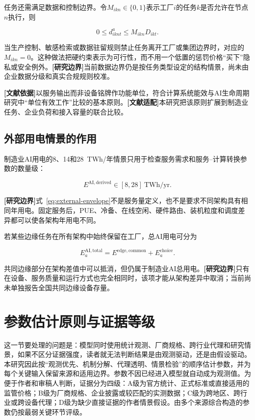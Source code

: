 \documentclass[preprint]{elsarticle}
\newcommand{\literature}{\textcolor{blue!70!black}{\textbf{[文献依据]}}}
\newcommand{\adapted}{\textcolor{violet!75!black}{\textbf{[文献适配]}}}
\newcommand{\boundary}{\textcolor{black!65}{\textbf{[研究边界]}}}
\begin{document}
任务还需满足数据和控制边界。令$M_{ikn}\in\{0,1\}$表示工厂$i$的任务$k$是否允许在节点$n$执行，则

\begin{equation}
 0\leq d^a_{iknt}\leq M_{ikn}D_{ikt}.
 \label{eq:task-admissibility}
\end{equation}

当生产控制、敏感检索或数据驻留规则禁止任务离开工厂或集团边界时，对应的$M_{ikn}=0$。这种做法把硬约束表示为可行性，而不用一个低置的惩罚价格“买下”隐私或安全例外。\boundary 当前数据边界仍是按任务类型设定的结构情景，尚未由企业数据分级和真实合规规则校准。

\literature 以服务输出而非设备铭牌作功能单位，符合计算系统能效与AI生命周期研究中“单位有效工作”比较的基本原则。\adapted 本研究把该原则扩展到制造业任务、企业负荷和接入容量的联合比较。

\subsection{外部用电情景的作用}

制造业AI用电的8、14和28~TWh/年情景只用于检查服务需求和服务--计算转换参数的数量级：

\begin{equation}
 E^{\mathrm{AI,derived}}\in[8,28]\ \mathrm{TWh/yr}.
 \label{eq:external-envelope}
\end{equation}

\boundary 式~\eqref{eq:external-envelope}不是服务量定义，也不是要求不同架构具有相同年用电。固定服务后，PUE、冷备、在线空闲、硬件路由、装机粒度和调度差异都可以使各架构年用电不同。

若某些边缘任务在所有架构中始终保留在工厂，总AI用电可分为

\begin{equation}
 E^{\mathrm{AI,total}}_a
 =E^{\mathrm{edge,common}}+E^{\mathrm{choice}}_a.
 \label{eq:common-edge-partition}
\end{equation}

共同边缘部分在架构差值中可以抵消，但仍属于制造业AI总用电。\boundary 只有在设备、服务质量和运行方式也完全相同时，该项才能从架构差异中取消；当前尚未单独报告全国共同边缘设备存量。

\section{参数估计原则与证据等级}

这一节要处理的问题是：模型同时使用统计观测、厂商规格、跨行业代理和研究情景，如果不区分证据强度，读者就无法判断结果是由观测驱动，还是由假设驱动。本研究因此按“观测优先、机制分解、代理透明、情景检验”的顺序估计参数，并为每个关键输入保留来源和适用边界。参数不因已经进入模型就自动成为观测值。为便于作者和审稿人判断，证据分为四级：A级为官方统计、正式标准或直接适用的监管价格；B级为厂商规格、企业披露或较匹配的实测数据；C级为跨地区、跨行业或跨设备代理；D级为缺少直接证据的作者情景假设。由多个来源综合构造的参数仍按最弱关键环节评级。
\end{document}
